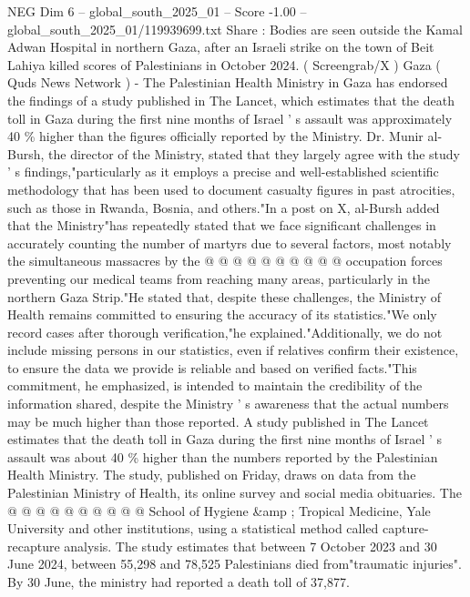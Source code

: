 \begin{textsample}{NEG Dim 6 – global\_south\_2025\_01 – Score -1.00 – global\_south\_2025\_01/119939699.txt}  \label{ex:f6_neg_016}
Share : Bodies are seen outside the Kamal Adwan Hospital in northern Gaza, after an Israeli strike on the town of Beit Lahiya killed scores of Palestinians in October 2024. ( Screengrab/X ) Gaza ( Quds News Network ) - The Palestinian Health Ministry in Gaza has endorsed the findings of a study published in The Lancet, which estimates that the death toll in Gaza during the first nine months of Israel ' s assault was approximately 40 \% higher than the figures officially reported by the Ministry.
Dr.
Munir al-Bursh, the director of the Ministry, stated that they largely agree with the study ' s findings,"particularly as it employs a precise and well-established scientific methodology that has been used to document casualty figures in past atrocities, such as those in Rwanda, Bosnia, and others."In a post on X, al-Bursh added that the Ministry"has repeatedly stated that we face significant challenges in accurately counting the number of martyrs due to several factors, most notably the simultaneous massacres by the @ @ @ @ @ @ @ @ @ @ occupation forces preventing our medical teams from reaching many areas, particularly in the northern Gaza Strip."He stated that, despite these challenges, the Ministry of Health remains committed to ensuring the accuracy of its statistics."We only record cases after thorough verification,"he explained."Additionally, we do not include missing persons in our statistics, even if relatives confirm their existence, to ensure the data we provide is reliable and based on verified facts."This commitment, he emphasized, is intended to maintain the credibility of the information shared, despite the Ministry ' s awareness that the actual numbers may be much higher than those reported.
A study published in The Lancet estimates that the death toll in Gaza during the first nine months of Israel ' s assault was about 40 \% higher than the numbers reported by the Palestinian Health Ministry.
The study, published on Friday, draws on data from the Palestinian Ministry of Health, its online survey and social media obituaries.
The @ @ @ @ @ @ @ @ @ @ School of Hygiene \&amp ; Tropical Medicine, Yale University and other institutions, using a statistical method called capture-recapture analysis.
The study estimates that between 7 October 2023 and 30 June 2024, between 55,298 and 78,525 Palestinians died from"traumatic injuries".
By 30 June, the ministry had reported a death toll of 37,877.

\end{textsample}
